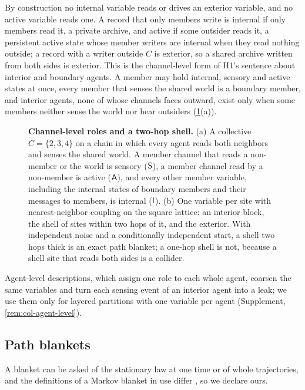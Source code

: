 By construction no internal variable reads or drives an exterior variable, and no active variable reads one. A record that only members write is internal if only members read it, a private archive, and active if some outsider reads it, a persistent active state whose member writers are internal when they read nothing outside; a record with a writer outside $C$ is exterior, so a shared archive written from both sides is exterior. This is the channel-level form of H1's sentence about interior and boundary agents. A member may hold internal, sensory and active states at once, every member that senses the shared world is a boundary member, and interior agents, none of whose channels faces outward, exist only when some members neither sense the world nor hear outsiders (\cref{fig:col-partition}(a)).

\begin{figure}[t]
  \centering
  \resizebox{\textwidth}{!}{}
  \caption{\textbf{Channel-level roles and a two-hop shell.} (a) A collective $C=\{2,3,4\}$ on a chain in which every agent reads both neighbors and senses the shared world. A member channel that reads a non-member or the world is sensory ($\mathsf{S}$), a member channel read by a non-member is active ($\mathsf{A}$), and every other member variable, including the internal states of boundary members and their messages to members, is internal ($\mathsf{I}$). (b) One variable per site with nearest-neighbor coupling on the square lattice: an interior block, the shell of sites within two hops of it, and the exterior. With independent noise and a conditionally independent start, a shell two hops thick is an exact path blanket; a one-hop shell is not, because a shell site that reads both sides is a collider.}
  \label{fig:col-partition}
\end{figure}

Agent-level descriptions, which assign one role to each whole agent, coarsen the same variables and turn each sensing event of an interior agent into a leak; we use them only for layered partitions with one variable per agent (Supplement, \cref{rem:col-agent-level}).

\subsection{Path blankets}\label{sec:col-path}

A blanket can be asked of the stationary law at one time or of whole trajectories, and the definitions of a Markov blanket in use differ \citep{biehl2021technical}, so we declare ours.

